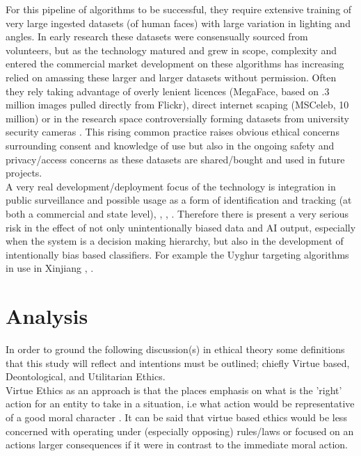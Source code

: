 \documentclass[11pt]{article}
\begin{document}
For this pipeline of algorithms to be successful, they require extensive training of very large ingested datasets (of human faces) with large variation in lighting and angles. In early research these datasets were consensually sourced from volunteers, but as the technology matured and grew in scope, complexity and entered the commercial market development on these algorithms has increasing relied on amassing these larger and larger datasets without permission. Often they rely taking advantage of overly lenient licences (MegaFace, based on .3 million images pulled directly from Flickr), direct internet scaping (MSCeleb, 10 million) or in the research space controversially forming datasets from university security cameras \cite{nature_main}. This rising common practice raises obvious ethical concerns surrounding consent and knowledge of use but also in the ongoing safety and privacy/access concerns as these datasets are shared/bought and used in future projects.\\

A very real development/deployment focus of the technology is integration in public surveillance and possible usage as a form of identification and tracking (at both a commercial and state level), \cite{nature_main}, \cite{thales}, \cite{nature_bias}. Therefore there is present a very serious risk in the effect of not only unintentionally biased data and AI output, especially when the system is a decision making hierarchy, but also in the development of intentionally bias based classifiers. For example the Uyghur targeting algorithms in use in Xinjiang \cite{nature_bias}, \cite{nature_main}.

\newpage
\section{Analysis}
In order to ground the following discussion(s) in ethical theory some definitions that this study will reflect and intentions must be outlined; chiefly Virtue based, Deontological, and Utilitarian Ethics.\\

Virtue Ethics as an approach is that the places emphasis on what is the 'right' action for an entity to take in a situation, i.e what action would be representative of a good moral character \cite{sep-ethics-virtue}. It can be said that virtue based ethics would be less concerned with operating under (especially opposing) rules/laws or focused on an actions larger consequences if it were in contrast to the immediate moral action.\\
\end{document}
